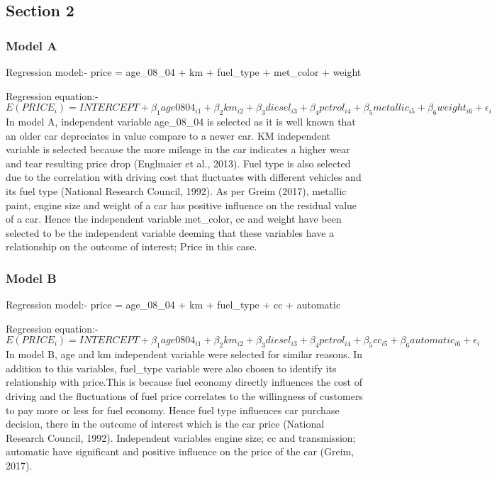 \documentclass[
]{article}
\begin{document}
\hypertarget{section-2}{%
\subsection{Section 2}\label{section-2}}

\hypertarget{model-a}{%
\subsubsection{Model A}\label{model-a}}

Regression model:- price = age\_08\_04 + km + fuel\_type + met\_color +
weight

Regression equation:-
\[E(PRICE_i) = INTERCEPT + \beta_1age0804_{i1} + \beta_2km_{i2} + \beta_3diesel_{i3} + \beta_4petrol_{i4} + \beta_5metallic_{i5} + \beta_6weight_{i6} + \epsilon_i\]
In model A, independent variable age\_08\_04 is selected as it is well
known that an older car depreciates in value compare to a newer car. KM
independent variable is selected because the more mileage in the car
indicates a higher wear and tear resulting price drop (Englmaier et al.,
2013). Fuel type is also selected due to the correlation with driving
cost that fluctuates with different vehicles and its fuel type (National
Research Council, 1992). As per Greim (2017), metallic paint, engine
size and weight of a car has positive influence on the residual value of
a car. Hence the independent variable met\_color, cc and weight have
been selected to be the independent variable deeming that these
variables have a relationship on the outcome of interest; Price in this
case.

\hypertarget{model-b}{%
\subsubsection{Model B}\label{model-b}}

Regression model:- price = age\_08\_04 + km + fuel\_type + cc +
automatic

Regression equation:-
\[E(PRICE_i) = INTERCEPT + \beta_1age0804_{i1} + \beta_2km_{i2} + \beta_3diesel_{i3} + \beta_4petrol_{i4} + \beta_5cc_{i5} + \beta_6automatic_{i6} + \epsilon_i\]
In model B, age and km independent variable were selected for similar
reasons. In addition to this variables, fuel\_type variable were also
chosen to identify its relationship with price.This is because fuel
economy directly influences the cost of driving and the fluctuations of
fuel price correlates to the willingness of customers to pay more or
less for fuel economy. Hence fuel type influences car purchase decision,
there in the outcome of interest which is the car price (National
Research Council, 1992). Independent variables engine size; cc and
transmission; automatic have significant and positive influence on the
price of the car (Greim, 2017).
\end{document}
